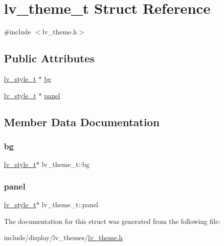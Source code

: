 \hypertarget{structlv__theme__t}{}\section{lv\+\_\+theme\+\_\+t Struct Reference}
\label{structlv__theme__t}


{\ttfamily \#include $<$lv\+\_\+theme.\+h$>$}

\subsection*{Public Attributes}
\begin{DoxyCompactItemize}
\item 
\mbox{\hyperlink{structlv__style__t}{lv\+\_\+style\+\_\+t}} $\ast$ \mbox{\hyperlink{structlv__theme__t_af35fd6df23d67ca02e2183691bfddc4a}{bg}}
\item 
\mbox{\hyperlink{structlv__style__t}{lv\+\_\+style\+\_\+t}} $\ast$ \mbox{\hyperlink{structlv__theme__t_ae2dd46ce715e39f6d7a22dee7be7861e}{panel}}
\end{DoxyCompactItemize}


\subsection{Member Data Documentation}
\mbox{\label{structlv__theme__t_af35fd6df23d67ca02e2183691bfddc4a}} 
\subsubsection{\texorpdfstring{bg}{bg}}
{\footnotesize\ttfamily \mbox{\hyperlink{structlv__style__t}{lv\+\_\+style\+\_\+t}}$\ast$ lv\+\_\+theme\+\_\+t\+::bg}

\mbox{\label{structlv__theme__t_ae2dd46ce715e39f6d7a22dee7be7861e}} 
\subsubsection{\texorpdfstring{panel}{panel}}
{\footnotesize\ttfamily \mbox{\hyperlink{structlv__style__t}{lv\+\_\+style\+\_\+t}}$\ast$ lv\+\_\+theme\+\_\+t\+::panel}



The documentation for this struct was generated from the following file\+:\begin{DoxyCompactItemize}
\item 
include/display/lv\+\_\+themes/\mbox{\hyperlink{lv__theme_8h}{lv\+\_\+theme.\+h}}\end{DoxyCompactItemize}
